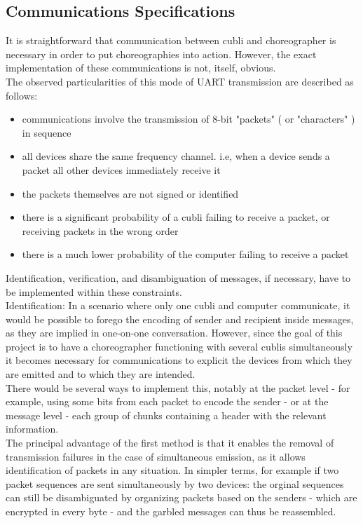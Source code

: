 \subsection{Communications Specifications}

It is straightforward that communication between cubli and choreographer is necessary in order to put choreographies into action. However, the exact implementation of these communications is not, itself, obvious.\\

The observed particularities of this mode of UART transmission are described as follows:
\begin{itemize}
\item communications involve the transmission of 8-bit "packets" ( or "characters" ) in sequence
\item all devices share the same frequency channel. i.e, when a device sends a packet all other devices immediately receive it
\item the packets themselves are not signed or identified
\item there is a significant probability of a cubli failing to receive a packet, or receiving packets in the wrong order
\item there is a much lower probability of the computer failing to receive a packet
\end{itemize}

Identification, verification, and disambiguation of messages, if necessary, have to be implemented within these constraints.\\

Identification: In a scenario where only one cubli and computer communicate, it would be possible to forego the encoding of sender and recipient inside messages, as they are implied in one-on-one conversation. However, since the goal of this project is to have a choreographer functioning with several cublis simultaneously it becomes necessary for communications to explicit the devices from which they are emitted and to which they are intended.\\

There would be several ways to implement this, notably at the packet level - for example, using some bits from each packet to encode the sender - or at the message level - each group of chunks containing a header with the relevant information.\\

The principal advantage of the first method is that it enables the removal of transmission failures in the case of simultaneous emission, as it allows identification of packets in any situation. In simpler terms, for example if two packet sequences are sent simultaneously by two devices: the orginal sequences can still be disambiguated by organizing packets based on the senders - which are encrypted in every byte - and the garbled messages can thus be reassembled.\\

